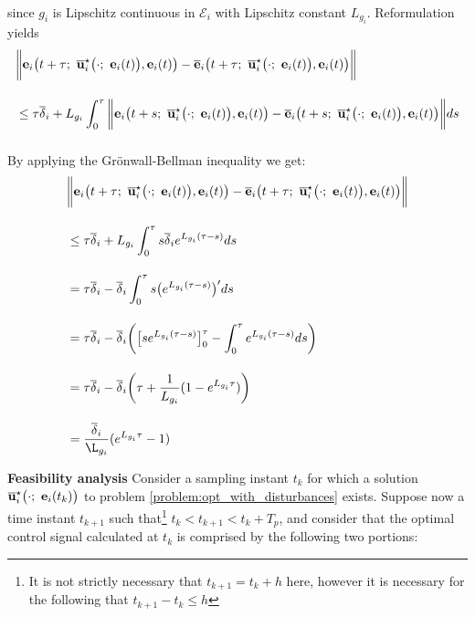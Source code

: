 \begin{gg_box}
\begin{align}
\end{align}
since $g_i$ is Lipschitz continuous in $\mathcal{E}_i$ with Lipschitz constant
$L_{g_i}$. Reformulation yields
\begin{align}
  &\bigg\| \vect{e}_i\big(t+\tau;\ \overline{\vect{u}}_i^{\star}\big(\cdot;\ \vect{e}_i(t)\big), \vect{e}_i(t)\big) -
  \overline{\vect{e}}_i\big(t+\tau;\ \overline{\vect{u}}_i^{\star}\big(\cdot;\ \vect{e}_i(t)\big), \vect{e}_i(t)\big) \bigg\| \\[2.5ex]
  &\leq \tau \overline{\delta}_i
  + L_{g_i} \int_{0}^{\tau} \bigg\| \vect{e}_i\big(t + s;\ \overline{\vect{u}}_i^{\star}\big(\cdot;\ \vect{e}_i(t)\big), \vect{e}_i(t)\big) -
  \overline{\vect{e}}_i\big(t + s;\ \overline{\vect{u}}_i^{\star}\big(\cdot;\ \vect{e}_i(t)\big), \vect{e}_i(t)\big) \bigg\| ds \\[2.5ex]
\end{align}
By applying the Gr\"{o}nwall-Bellman inequality we get:
\begin{align}
  &\bigg\| \vect{e}_i\big(t + \tau;\ \overline{\vect{u}}_i^{\star}\big(\cdot;\ \vect{e}_i(t)\big), \vect{e}_i(t)\big) -
    \overline{\vect{e}}_i\big(t + \tau;\ \overline{\vect{u}}_i^{\star}\big(\cdot;\ \vect{e}_i(t)\big), \vect{e}_i(t)\big) \bigg\| \\[2.5ex]
  &\leq \tau \overline{\delta}_i +  L_{g_i} \int_{0}^{\tau} s \overline{\delta}_i e^{L_{g_i}(\tau - s)} ds \\[2.5ex]
  &= \tau \overline{\delta}_i - \overline{\delta}_i \int_{0}^{\tau} s  \big(e^{L_{g_i}(\tau - s)}\big)' ds \\[2.5ex]
  &= \tau \overline{\delta}_i -
    \overline{\delta}_i \bigg( \big[s e^{L_{g_i}(\tau - s)}\big]_0^{\tau}
      - \int_{0}^{\tau} e^{L_{g_i}(\tau - s)}ds\bigg) \\[2.5ex]
  &= \tau \overline{\delta}_i - \overline{\delta}_i \bigg( \tau + \dfrac{1}{L_{g_i}} (1- e^{L_{g_i}\tau})\bigg) \\[2.5ex]
  &= \dfrac{\overline{\delta}_i}{\L_{g_i}} (e^{L_{g_i}\tau} - 1)
\end{align}
\qedsymbol
\end{gg_box}


\textbf{Feasibility analysis}
Consider a sampling instant $t_k$ for which a
solution $\overline{\vect{u}}_i^{\star}\big(\cdot;\ \vect{e}_i(t_k)\big)$ to
problem \eqref{problem:opt_with_disturbances} exists.
Suppose now a time instant $t_{k+1}$ such that\footnote{It is not strictly necessary
that $t_{k+1} = t_k + h$ here, however it is necessary for the following that
$t_{k+1} - t_k \leq h$} $t_k < t_{k+1} < t_k + T_p$, and consider that the
optimal control signal calculated at $t_k$ is comprised by the following two
portions:

